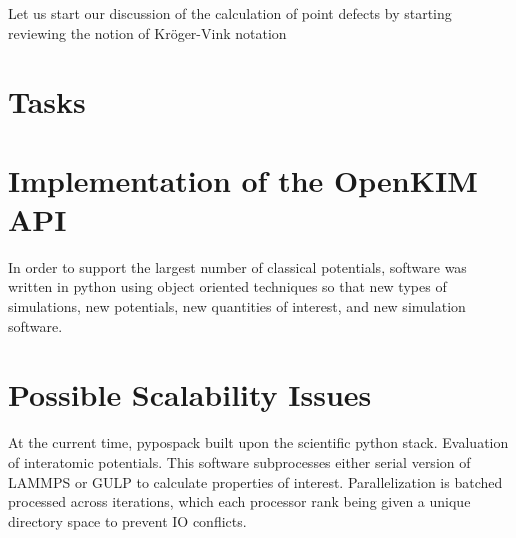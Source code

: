Let us start our discussion of the calculation of point defects by starting reviewing the notion of Kr\"oger-Vink notation\cite{kroger1956_notation}

\section{Tasks}


\section{Implementation of the OpenKIM API}

In order to support the largest number of classical potentials, software was written in python using object oriented techniques so that new types of simulations, new potentials, new quantities of interest, and new simulation software.

\section{Possible Scalability Issues}

At the current time, pypospack built upon the scientific python stack.
Evaluation of interatomic potentials.  This software subprocesses either serial version of LAMMPS or GULP to calculate properties of interest.  Parallelization is batched processed across iterations, which each processor rank being given a unique directory space to prevent IO conflicts.
